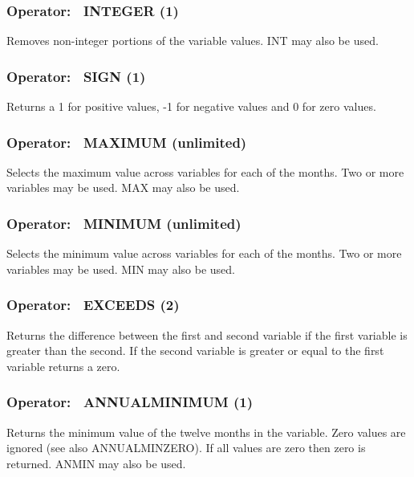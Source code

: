 \subsubsection{Operator:~ INTEGER (1)}\label{operator-integer-1}

Removes non-integer portions of the variable values. INT may also be used.

\subsubsection{Operator:~ SIGN (1)}\label{operator-sign-1}

Returns a 1 for positive values, -1 for negative values and 0 for zero values.

\subsubsection{Operator:~ MAXIMUM (unlimited)}\label{operator-maximum-unlimited}

Selects the maximum value across variables for each of the months. Two or more variables may be used. MAX may also be used.

\subsubsection{Operator:~ MINIMUM (unlimited)}\label{operator-minimum-unlimited}

Selects the minimum value across variables for each of the months. Two or more variables may be used. MIN may also be used.

\subsubsection{Operator:~ EXCEEDS (2)}\label{operator-exceeds-2}

Returns the difference between the first and second variable if the first variable is greater than the second. If the second variable is greater or equal to the first variable returns a zero.

\subsubsection{Operator:~ ANNUALMINIMUM (1)}\label{operator-annualminimum-1}

Returns the minimum value of the twelve months in the variable. Zero values are ignored (see also ANNUALMINZERO). If all values are zero then zero is returned. ANMIN may also be used.


